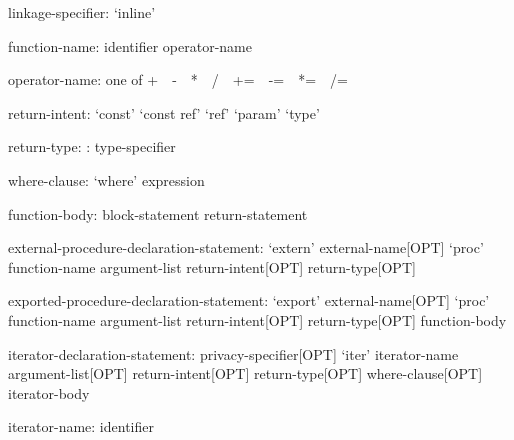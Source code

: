 \begin{syntax}
linkage-specifier:
  `inline'
\end{syntax}

\begin{syntax}
function-name:
  identifier
  operator-name
\end{syntax}

\begin{syntax}
operator-name: one of
  + $ $ $ $ - $ $ $ $ * $ $ $ $ / $ $ $ $ %
  += $ $ $ $ -= $ $ $ $ *= $ $ $ $ /= $ $ $ $ %
\end{syntax}

\begin{syntax}
return-intent:
  `const'
  `const ref'
  `ref'
  `param'
  `type'
\end{syntax}

\begin{syntax}
return-type:
  : type-specifier
\end{syntax}

\begin{syntax}
where-clause:
  `where' expression
\end{syntax}

\begin{syntax}
function-body:
  block-statement
  return-statement
\end{syntax}

\begin{syntax}
external-procedure-declaration-statement:
  `extern' external-name[OPT] `proc' function-name argument-list return-intent[OPT] return-type[OPT]
\end{syntax}

\begin{syntax}
exported-procedure-declaration-statement:
  `export' external-name[OPT] `proc' function-name argument-list return-intent[OPT] return-type[OPT]
    function-body
\end{syntax}

\begin{syntax}
iterator-declaration-statement:
  privacy-specifier[OPT] `iter' iterator-name argument-list[OPT] return-intent[OPT] return-type[OPT] where-clause[OPT]
  iterator-body
\end{syntax}

\begin{syntax}
iterator-name:
  identifier
\end{syntax}

